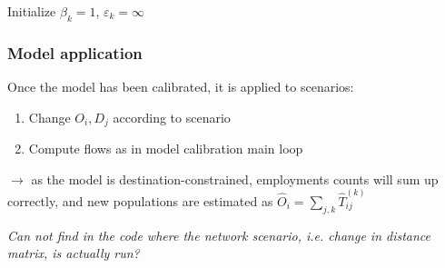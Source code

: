 \documentclass{article}
\begin{document}
\begin{algorithm}[H]
 Initialize $\beta_k = 1$, $\varepsilon_k = \infty$\;
\end{algorithm}




\subsubsection*{Model application}

Once the model has been calibrated, it is applied to scenarios:

\begin{enumerate}
    \item Change $O_i,D_j$ according to scenario
    \item Compute flows as in model calibration main loop
\end{enumerate}

$\rightarrow$ as the model is destination-constrained, employments counts will sum up correctly, and new populations are estimated as $\hat{O}_i = \sum_{j,k} \hat{T}^{(k)}_{ij}$


\textit{Can not find in the code where the network scenario, i.e. change in distance matrix, is actually run?}
\end{document}
